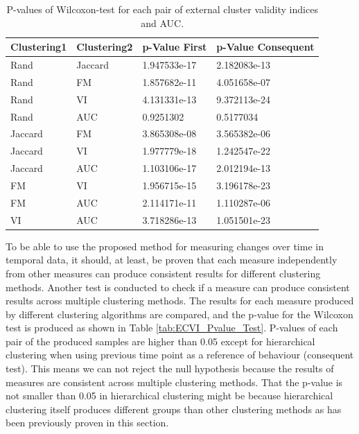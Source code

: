 \begin{table}[!h]
    \small
    \centering
    \caption{P-values of Wilcoxon-test for each pair of external cluster validity indices and AUC.}
    \label{tab:ECVI_Failed_Pvalue_Test}
    \begin{tabular}{llll}
        \toprule
        \textbf{Clustering1} & \textbf{Clustering2}  & \textbf{p-Value First} & \textbf{p-Value Consequent} \\ \midrule
        Rand      & Jaccard  & 1.947533e-17     & 2.182083e-13          \\ 
        Rand      & FM       & 1.857682e-11     & 4.051658e-07          \\ 
        Rand      & VI       & 4.131331e-13     & 9.372113e-24          \\ 
        Rand      & AUC      & 0.9251302        & 0.5177034             \\ 
        
        Jaccard   & FM       & 3.865308e-08     & 3.565382e-06          \\ 
        Jaccard   & VI       & 1.977779e-18     & 1.242547e-22          \\ 
        Jaccard   & AUC      & 1.103106e-17     & 2.012194e-13          \\ 
        
        FM        & VI       & 1.956715e-15     & 3.196178e-23          \\ 
        FM        & AUC      & 2.114171e-11     & 1.110287e-06          \\ 
        
        VI        & AUC      & 3.718286e-13     & 1.051501e-23          \\     
        \bottomrule
    \end{tabular}
\end{table}

To be able to use the proposed method for measuring changes over time in temporal data, it should, at least, be proven that each measure independently from other measures can produce consistent results for different clustering methods. Another test is conducted to check if a measure can produce consistent results across multiple clustering methods. The results for each measure produced by different clustering algorithms are compared, and the p-value for the Wilcoxon test is produced as shown in Table \ref{tab:ECVI_Pvalue_Test}. P-values of each pair of the produced samples are higher than 0.05 except for hierarchical clustering when using previous time point as a reference of behaviour (consequent test). This means we can not reject the null hypothesis because the results of measures are consistent across multiple clustering methods. That the p-value is not smaller than 0.05 in hierarchical clustering might be because hierarchical clustering itself produces different groups than other clustering methods as has been previously proven in this section.


